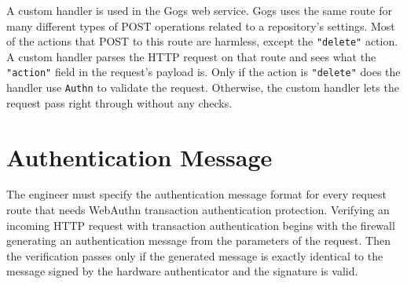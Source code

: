 A custom handler is used in the Gogs web service. Gogs uses the same route for many different types of POST operations related to a repository's settings. Most of the actions that POST to this route are harmless, except the \lstinline{"delete"} action. A custom handler parses the HTTP request on that route and sees what the \lstinline{"action"} field in the request's payload is. Only if the action is \lstinline{"delete"} does the handler use \lstinline{Authn} to validate the request. Otherwise, the custom handler lets the request pass right through without any checks.









\section{Authentication Message}\label{Sec:AuthenticationMessage}

The engineer must specify the authentication message format for every request route that needs WebAuthn transaction authentication protection. Verifying an incoming HTTP request with transaction authentication begins with the firewall generating an authentication message from the parameters of the request. Then the verification passes only if the generated message is exactly identical to the message signed by the hardware authenticator and the signature is valid.

